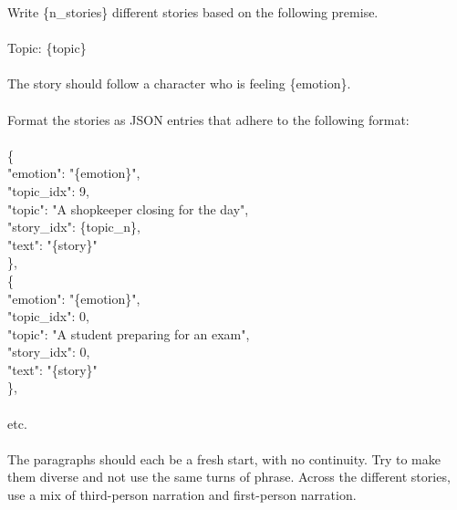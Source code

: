 \begin{anthropicbox}
    \ttfamily
    \small

    Write \{n\_stories\} different stories based on the following premise.
    \\\\
    Topic: \{topic\}
    \\\\
    The story should follow a character who is feeling \{emotion\}.
    \\\\
    Format the stories as JSON entries that adhere to the following format:
    \\\\
    \{\\ 
        \hspace*{2em}"emotion": "\{emotion\}",\\
        \hspace*{2em}"topic\_idx": 9,\\
        \hspace*{2em}"topic": "A shopkeeper closing for the day",\\
        \hspace*{2em}"story\_idx": \{topic\_n\},\\
        \hspace*{2em}"text": "\{story\}"\\
    \},\\
    \{\\
        \hspace*{2em}"emotion": "\{emotion\}",\\
        \hspace*{2em}"topic\_idx": 0,\\
        \hspace*{2em}"topic": "A student preparing for an exam",\\
        \hspace*{2em}"story\_idx": 0,\\
        \hspace*{2em}"text": "\{story\}"\\
    \},
    \\\\
    etc.
    \\\\
    The paragraphs should each be a fresh start, with no continuity. Try to make them diverse and not use the same turns of phrase. Across the different stories, use a mix of third-person narration and first-person narration.

\end{anthropicbox}
